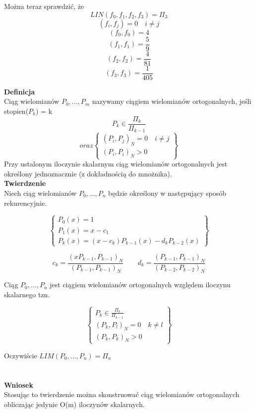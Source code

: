 \documentclass[polish]{kbk}
\begin{document}
Można teraz sprawdzić, że
$$ LIN ( f_0, f_1, f_2, f_3 ) = \Pi_3 $$
$$ (f_i, f_j) = 0 \quad i \neq j $$
$$ (f_0, f_0) = 4 $$
$$ (f_1, f_1) = \frac{5}{9} $$
$$ (f_2, f_2) = \frac{4}{81} $$
$$ (f_3, f_3) = \frac{1}{405} $$

  \textbf{Definicja} \\
  Ciąg wielomianów \( P_0, ..., P_m \) nazywamy ciągiem wielomianów ortogonalnych, jeśli \\stopien(\(P_k\)) = k
  $$ P_k  \in \frac{\Pi_k}{ \Pi_{k-1}} $$
      \[
   oraz \left\{\begin{array}{lr}
        (P_i, P_j)_N = 0 \quad i \neq j \\
       (P_i, P_i)_N > 0
        \end{array}\right\} 
  \]
  Przy ustalonym iloczynie skalarnym ciąg wielomianów ortogonalnych jest określony jednoznacznie (z dokładnością do mnożnika).\\

  \textbf{Twierdzenie} \\
  Niech ciąg wielomianów  \( P_0, ..., P_n \) będzie określony w następujący sposób rekurencyjnie.
  
        \[
	\left\{\begin{array}{lr}
	 P_0(x) = 1 \\
	 P_1(x) = x-c_1 \\
	 P_k(x) = (x-c_k)P_{k-1}(x) -d_kP_{k-2}(x)     
        \end{array}\right\} 
  \]
  
  $$ c_k = \frac { (xP_{k-1}, P_{k-1})_N }{ (P_{k-1}, P_{k-1})_N } \quad \quad d_k = \frac { (P_{k-1}, P_{k-1} )_N } { (P_{k-2}, P_{k-2})_N} $$
  
  Ciąg  \( P_0, ..., P_n \) jest ciągiem wielomianów ortogonalnych względem iloczynu skalarnego tzn. 
  
          \[
	\left\{\begin{array}{lr}
	 P_k \in \frac{ \Pi_k}{ \Pi_{k-1} }  \\
	 (P_k, P_l)_N = 0 \quad k \neq l \\
	 (P_k, P_k)_N > 0  
        \end{array}\right\} 
  \]
  
  Oczywiście \( LIM ( P_0, ..., P_n ) = \Pi_n \)
  \\\\\\
    \textbf{Wniosek} \\
    Stosując to twierdzenie można skonstruować ciąg wielomianów ortogonalnych obliczając jedynie O(m) iloczynów skalarnych.\\
    
\end{document}
